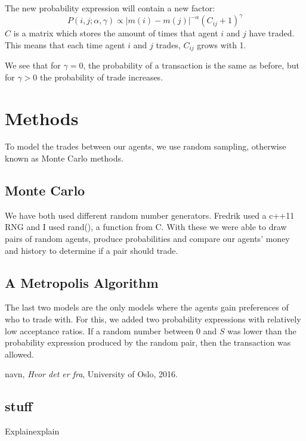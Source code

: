 \documentclass[10pt, a4paper]{article}
\begin{document}
The new probability expression will contain a new factor:
\begin{equation}
 P(i,j;\alpha,\gamma) \propto \left|m(i)-m(j) \right|^{-\alpha}(C_{ij} + 1)^{\gamma}
\end{equation}
$C$ is a matrix which stores the amount of times that agent $i$ and $j$ have traded.
This means that each time agent $i$ and $j$ trades, $C_{ij}$ grows with 1.

We see that for $\gamma = 0$, the probability of a transaction is the same as before, but for
$\gamma > 0$ the probability of trade increases.

\section{Methods}

To model the trades between our agents, we use random sampling, otherwise known as Monte Carlo methods.
\subsection{Monte Carlo}
We have both used different random number generators. Fredrik used a c++11 RNG and I used rand(), a function from C.
With these we were able to draw pairs of random agents, produce probabilities and compare our agents' money and history to determine if a 
pair should trade.
\subsection{A Metropolis Algorithm}
The last two models are the only models where the agents gain preferences of who to trade with. For this, we added two probability expressions with relatively low acceptance ratios.
If a random number between $0$ and $S$ was lower than the probability expression produced by the random pair, then the transaction was allowed.

\begin{thebibliography}{9}

	navn,
	\emph{Hvor det er fra},
	University of Oslo,
	2016.
	
\end{thebibliography}

\begin{appendix}
\section{stuff}
\label{app1}
Explainexplain

\end{appendix}
\end{document}
